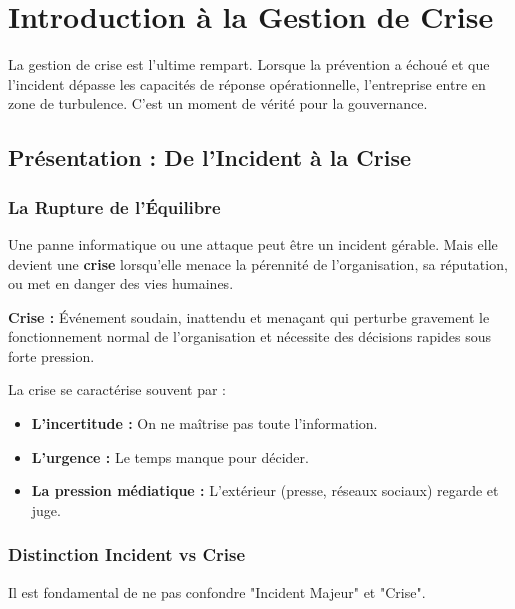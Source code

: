 \chapter{Introduction à la Gestion de Crise}
\label{chap:introcrise}

La gestion de crise est l'ultime rempart. Lorsque la prévention a échoué et que l'incident dépasse les capacités de réponse opérationnelle, l'entreprise entre en zone de turbulence. C'est un moment de vérité pour la gouvernance.

\section{Présentation : De l'Incident à la Crise}

\subsection{La Rupture de l'Équilibre}

Une panne informatique ou une attaque peut être un incident gérable. Mais elle devient une \textbf{crise} lorsqu'elle menace la pérennité de l'organisation, sa réputation, ou met en danger des vies humaines.

\begin{boxdef}
\textbf{Crise :} Événement soudain, inattendu et menaçant qui perturbe gravement le fonctionnement normal de l'organisation et nécessite des décisions rapides sous forte pression.
\end{boxdef}

La crise se caractérise souvent par :
\begin{itemize}
    \item \textbf{L'incertitude :} On ne maîtrise pas toute l'information.
    \item \textbf{L'urgence :} Le temps manque pour décider.
    \item \textbf{La pression médiatique :} L'extérieur (presse, réseaux sociaux) regarde et juge.
\end{itemize}

\subsection{Distinction Incident vs Crise}

Il est fondamental de ne pas confondre "Incident Majeur" et "Crise".

